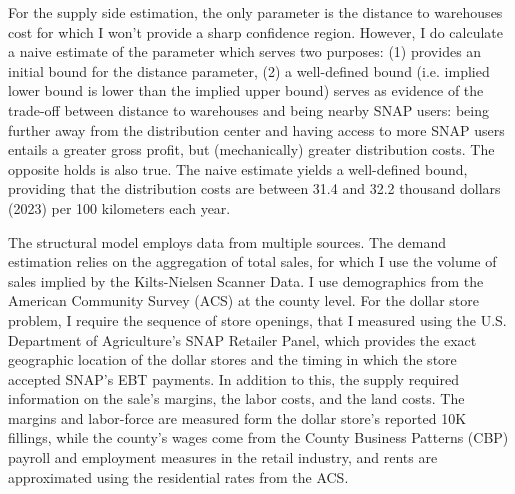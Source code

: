 \documentclass[11.5pt]{article}
\begin{document}






For the supply side estimation, the only parameter is the distance to warehouses cost for which I won't provide a sharp confidence region. However, I do calculate a naive estimate of the parameter which serves two purposes: (1) provides an initial bound for the distance parameter, (2) a well-defined bound (i.e. implied lower bound is lower than the implied upper bound) serves as evidence of the trade-off between distance to warehouses and being nearby SNAP users: being further away from the distribution center and having access to more SNAP users entails a greater gross profit, but (mechanically) greater distribution costs. The opposite holds is also true. The naive estimate yields a well-defined bound, providing that the distribution costs are between 31.4 and 32.2 thousand dollars (2023) per 100 kilometers each year. %



The structural model employs data from multiple sources. The demand estimation relies on the aggregation of total sales, for which I use the volume of sales implied by the Kilts-Nielsen Scanner Data. I use demographics from the American Community Survey (ACS) at the county level. For the dollar store problem, I require the sequence of store openings, that I measured using the U.S. Department of Agriculture's SNAP Retailer Panel, which provides the exact geographic location of the dollar stores and the timing in which the store accepted SNAP's EBT payments. In addition to this, the supply required information on the sale's margins, the labor costs, and the land costs. The margins and labor-force are measured form the dollar store's reported 10K fillings, while the county's wages come from the County Business Patterns (CBP) payroll and employment measures in the retail industry, and rents are approximated using the residential rates from the ACS. 
\end{document}
